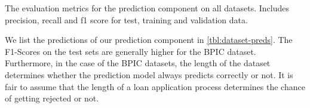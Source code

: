 \documentclass[./../../paper.tex]{subfiles}
\begin{document}
\begin{table}[htbp]
        \makebox[\linewidth]{
            
            }
            \caption{The evaluation metrics for the prediction component on all datasets. Includes precision, recall and f1 score for test, training and validation data.}
            \label{tbl:dataset-preds}
\end{table}

We list the predictions of our prediction component in \autoref{tbl:dataset-preds}. The F1-Scores on the test sets are generally higher for the BPIC dataset. Furthermore, in the case of the BPIC datasets, the length of the dataset determines whether the prediction model always predicts correctly or not. It is fair to assume that the length of a loan application process determines the chance of getting rejected or not. 
\end{document}
